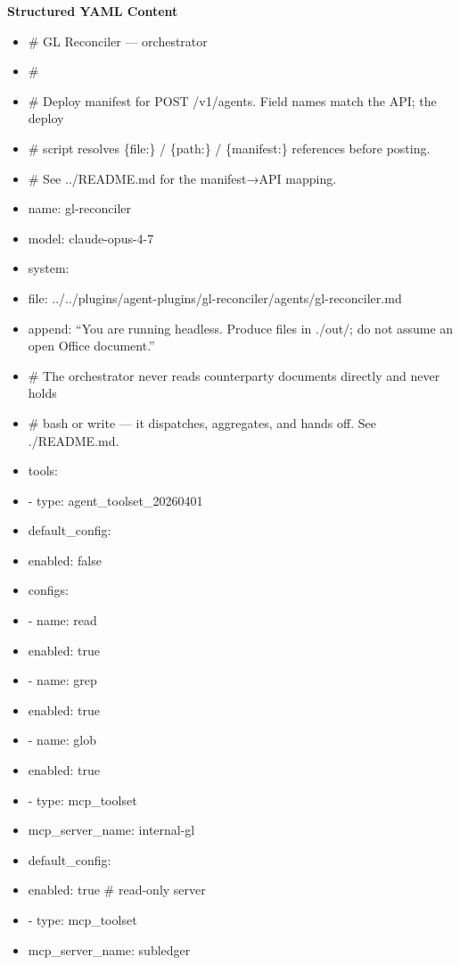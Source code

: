 \documentclass[11pt]{article}
\begin{document}
\textbf{Structured YAML Content}
\begin{itemize}[leftmargin=*,itemsep=2pt,topsep=2pt]
\item {} \# GL Reconciler — orchestrator
\item {} \#
\item {} \# Deploy manifest for POST /v1/agents. Field names match the API; the deploy
\item {} \# script resolves \{file:\} / \{path:\} / \{manifest:\} references before posting.
\item {} \# See ../README.md for the manifest→API mapping.
\item {} name: gl-reconciler
\item {} model: claude-opus-4-7
\item {} system:
\item {} file: ../../plugins/agent-plugins/gl-reconciler/agents/gl-reconciler.md
\item {} append: ``You are running headless. Produce files in ./out/; do not assume an open Office document.''
\item {} \# The orchestrator never reads counterparty documents directly and never holds
\item {} \# bash or write — it dispatches, aggregates, and hands off. See ./README.md.
\item {} tools:
\item {} - type: agent\_\allowbreak{}toolset\_\allowbreak{}20260401
\item {} default\_\allowbreak{}config:
\item {} enabled: false
\item {} configs:
\item {} - name: read
\item {} enabled: true
\item {} - name: grep
\item {} enabled: true
\item {} - name: glob
\item {} enabled: true
\item {} - type: mcp\_\allowbreak{}toolset
\item {} mcp\_\allowbreak{}server\_\allowbreak{}name: internal-gl
\item {} default\_\allowbreak{}config:
\item {} enabled: true \# read-only server
\item {} - type: mcp\_\allowbreak{}toolset
\item {} mcp\_\allowbreak{}server\_\allowbreak{}name: subledger

\end{itemize}
\end{document}

